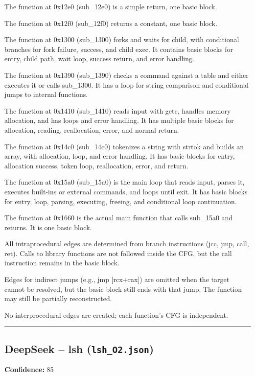 The function at 0x12e0 (sub\_12e0) is a simple return, one basic block.

The function at 0x12f0 (sub\_12f0) returns a constant, one basic block.

The function at 0x1300 (sub\_1300) forks and waits for child, with conditional branches for fork failure, success, and child exec. It contains basic blocks for entry, child path, wait loop, success return, and error handling.

The function at 0x1390 (sub\_1390) checks a command against a table and either executes it or calls sub\_1300. It has a loop for string comparison and conditional jumps to internal functions.

The function at 0x1410 (sub\_1410) reads input with getc, handles memory allocation, and has loops and error handling. It has multiple basic blocks for allocation, reading, reallocation, error, and normal return.

The function at 0x14c0 (sub\_14c0) tokenizes a string with strtok and builds an array, with allocation, loop, and error handling. It has basic blocks for entry, allocation success, token loop, reallocation, error, and return.

The function at 0x15a0 (sub\_15a0) is the main loop that reads input, parses it, executes built-ins or external commands, and loops until exit. It has basic blocks for entry, loop, parsing, executing, freeing, and conditional loop continuation.

The function at 0x1660 is the actual main function that calls sub\_15a0 and returns. It is one basic block.

All intraprocedural edges are determined from branch instructions (jcc, jmp, call, ret). Calls to library functions are not followed inside the CFG, but the call instruction remains in the basic block.

Edges for indirect jumps (e.g., jmp [rcx+rax]) are omitted when the target cannot be resolved, but the basic block still ends with that jump. The function may still be partially reconstructed.

No interprocedural edges are created; each function's CFG is independent.

\bigskip
\hrule
\bigskip

\subsection{DeepSeek -- lsh (\texttt{lsh\_O2.json})}

\textbf{Confidence:} 85

